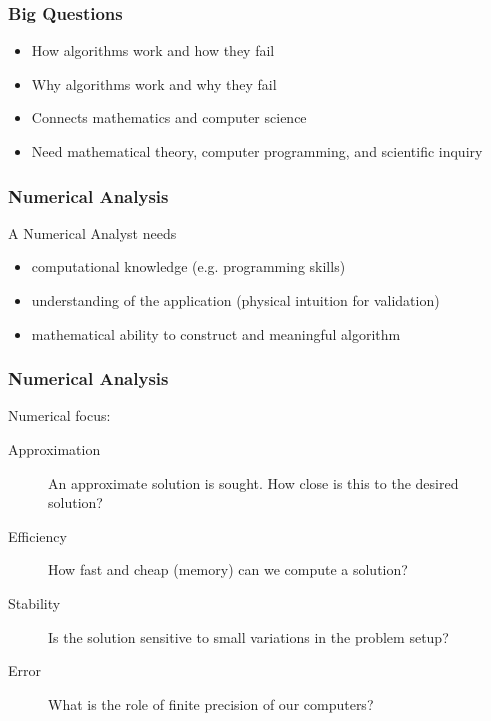 \documentclass[10pt]{beamer}
\begin{document}
\begin{frame}
\frametitle{Big Questions}
\begin{block}{}
\begin{itemize}
\item How algorithms work and how they fail
\item Why algorithms work and why they fail
\end{itemize}
\end{block}
\begin{itemize}
\item Connects mathematics and computer science
\item Need mathematical theory, computer programming, and scientific inquiry
\end{itemize}
\end{frame}
\begin{frame}
\frametitle{Numerical Analysis}
A Numerical Analyst needs
\begin{itemize}
\item computational knowledge (e.g. programming skills)
\item understanding of the application (physical intuition for validation)
\item mathematical ability to construct and meaningful algorithm
\end{itemize}
\end{frame}
\begin{frame}
\frametitle{Numerical Analysis}
Numerical focus:
\begin{description}
\item[Approximation] An approximate solution is sought.  How close is this
to the desired solution?
\item[Efficiency] How fast and cheap (memory) can we compute a solution?
\item[Stability] Is the solution sensitive to small variations in the
problem setup?
\item[Error] What is the role of finite precision of our computers?
\end{description}
\end{frame}
\end{document}
